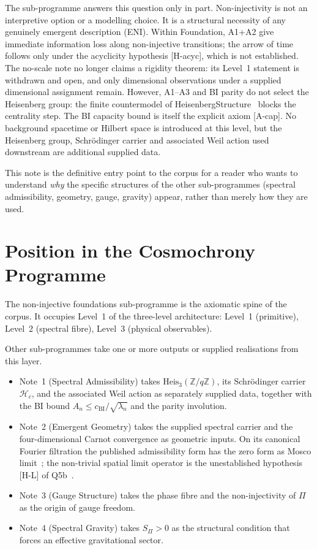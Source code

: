\documentclass[11pt,a4paper]{article}
\theoremstyle{definition}
\newcommand{\Heis}{\mathrm{Heis}}
\newcommand{\SPI}{S_\Pi}
\newcommand{\cchi}{c_{\mathrm{BI}}}
\newcommand{\Hc}{\mathcal{H}_c}
\begin{document}
    \medskip
    The sub-programme answers this question only in part.
    Non-injectivity is not an interpretive option or a modelling choice.
    It is a structural necessity of any genuinely emergent description (ENI).
    Within Foundation, A1+A2 give immediate information loss along non-injective transitions;
    the arrow of time follows only under the acyclicity hypothesis [H-acyc], which is not
    established.  The no-scale note no longer claims a rigidity theorem: its Level~1 statement is
    withdrawn and open, and only dimensional observations under a supplied dimensional assignment remain.
    However, A1--A3 and BI parity do not select the Heisenberg group: the finite countermodel
    of HeisenbergStructure~\cite{Beau2026HeisenbergStructure} blocks the centrality step.
    The BI capacity bound is itself the explicit axiom [A-cap].
    No background spacetime or Hilbert space is introduced at this level, but the Heisenberg
    group, Schr\"odinger carrier and associated Weil action used downstream are additional
    supplied data.

    \medskip
    This note is the definitive entry point to the corpus for a reader who wants to understand
    \emph{why} the specific structures of the other sub-programmes (spectral admissibility,
    geometry, gauge, gravity) appear, rather than merely how they are used.

  \section{Position in the Cosmochrony Programme}
    \label{sec:position}

    The non-injective foundations sub-programme is the axiomatic spine of the corpus.
    It occupies Level~1 of the three-level architecture:
    Level~1 (primitive), Level~2 (spectral fibre), Level~3 (physical observables).

    Other sub-programmes take one or more outputs or supplied realisations from this layer.
    \begin{itemize}
      \item Note~1 (Spectral Admissibility) takes $\Heis_3(\mathbb{Z}/q\mathbb{Z})$, its
      Schr\"odinger carrier $\Hc$, and the associated Weil action as separately supplied data,
      together with the BI bound $A_n \leq \cchi/\sqrt{\lambda_n}$ and the parity involution.
      \item Note~2 (Emergent Geometry) takes the supplied spectral carrier and the
      four-dimensional Carnot convergence as geometric inputs.
      On its canonical Fourier filtration the published admissibility form has the zero form as
      Mosco limit~\cite{Beau2026q5a}; the non-trivial spatial limit operator is the unestablished
      hypothesis [H-L] of Q5b~\cite{Beau2026q5b}.
      \item Note~3 (Gauge Structure) takes the phase fibre and the non-injectivity of $\Pi$ as
      the origin of gauge freedom.
      \item Note~4 (Spectral Gravity) takes $\SPI > 0$ as the structural condition that forces
      an effective gravitational sector.
    \end{itemize}
\end{document}
